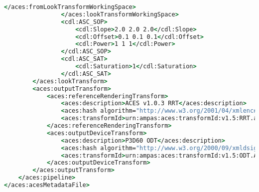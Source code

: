 \begin{lstlisting}[language=csh]
                    </aces:fromLookTransformWorkingSpace>
                </aces:lookTransformWorkingSpace>
                <cdl:ASC_SOP>
                    <cdl:Slope>2.0 2.0 2.0</cdl:Slope>
                    <cdl:Offset>0.1 0.1 0.1</cdl:Offset>
                    <cdl:Power>1 1 1</cdl:Power>
                </cdl:ASC_SOP>
                <cdl:ASC_SAT>
                    <cdl:Saturation>1</cdl:Saturation>
                </cdl:ASC_SAT>
        </aces:lookTransform>
        <aces:outputTransform>
            <aces:referenceRenderingTransform>
                <aces:description>ACES v1.0.3 RRT</aces:description>
                <aces:hash algorithm="http://www.w3.org/2001/04/xmlenc#sha256">c81af4fb4a22ee0353308e4582708951df4682bf73f838c24bf44e585fc3bb61</aces:hash>
                <aces:transformId>urn:ampas:aces:transformId:v1.5:RRT.a1.0.3</aces:transformId>
            </aces:referenceRenderingTransform>
            <aces:outputDeviceTransform>
                <aces:description>P3D60 ODT</aces:description>
                <aces:hash algorithm="http://www.w3.org/2000/09/xmldsig#sha1">efd279a82c2d52ee8c49dc0793499dc86bb1a4a3fa0dfb420d59c2814c55aea6</aces:hash>
                <aces:transformId>urn:ampas:aces:transformId:v1.5:ODT.Academy.P3D60_48nits.a1.0.3</aces:transformId>
            </aces:outputDeviceTransform>
        </aces:outputTransform>
    </aces:pipeline>
</aces:acesMetadataFile>
\end{lstlisting}

\newpage
